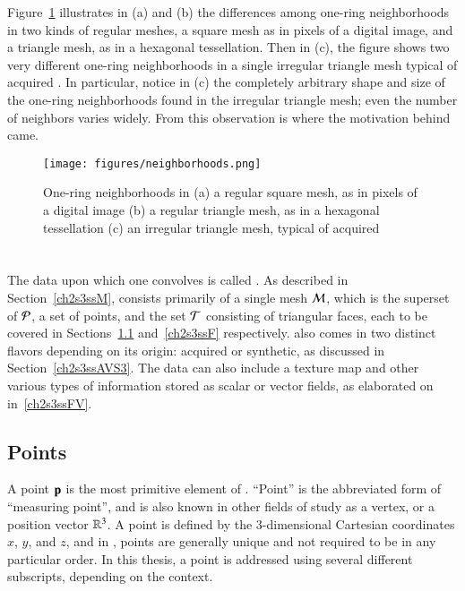 Figure~\ref{fig:neighborhoods} illustrates in (a) and (b) the differences among one-ring neighborhoods in two kinds of regular meshes, a square mesh as in pixels of a digital image, and a triangle mesh, as in a hexagonal tessellation. Then in (c), the figure shows two very different one-ring neighborhoods in a single irregular triangle mesh typical of acquired \tdd{}. In particular, notice in (c) the completely arbitrary shape and size of the one-ring neighborhoods found in the irregular triangle mesh; even the number of neighbors varies widely. From this observation is where the motivation behind  came.

\begin{figure}
\ffigbox
	{\texttt{[image: figures/neighborhoods.png]}}
	{\caption[One-ring neighborhoods in regular and irregular meshes]{One-ring neighborhoods in (a) a regular square mesh, as in pixels of a digital image (b) a regular triangle mesh, as in a hexagonal tessellation (c) an irregular triangle mesh, typical of acquired \tdd{}}\label{fig:neighborhoods}}
\end{figure}

%
%
%
%
\section{\tdd}
\label{ch2s3}
The data upon which one convolves  is called \tdd{}. As described in Section~\ref{ch2s3ssM}, \tdd{} consists primarily of a single mesh $\mathcal{M}$, which is the superset of $\mathcal{P}$, a set of points, and the set $\mathcal{T}$ consisting of triangular faces, each to be covered in Sections~\ref{ch2s3ssP} and~\ref{ch2s3ssF} respectively. \tdd{} also comes in two distinct flavors depending on its origin: acquired or synthetic, as discussed in Section~\ref{ch2s3ssAVS3}. The data can also include a texture map and other various types of information stored as scalar or vector fields, as elaborated on in~\ref{ch2s3ssFV}.

%
%
%
\subsection{Points}
\label{ch2s3ssP}
A point $\mathbf{p}$ is the most primitive element of \tdd{}. ``Point'' is the abbreviated form of ``measuring point'', and is also known in other fields of study as a vertex, or a position vector $\mathbb{R}^{3}$. A point is defined by the 3-dimensional Cartesian coordinates $x$, $y$, and $z$, and in \tdd{}, points are generally unique and not required to be in any particular order. In this thesis, a point is addressed using several different subscripts, depending on the context.

